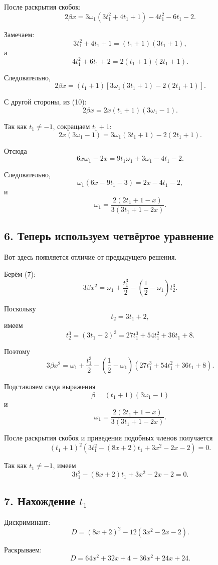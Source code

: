 \documentclass[12pt,a4paper]{article}
\begin{document}
	После раскрытия скобок:
	\[
	2\beta x
	=
	3\omega_1(3t_1^2+4t_1+1)
	-4t_1^2-6t_1-2.
	\]
	
	Замечаем:
	\[
	3t_1^2+4t_1+1=(t_1+1)(3t_1+1),
	\]
	а
	\[
	4t_1^2+6t_1+2
	=
	2(t_1+1)(2t_1+1).
	\]
	
	Следовательно,
	\[
	2\beta x
	=
	(t_1+1)
	\left[
	3\omega_1(3t_1+1)-2(2t_1+1)
	\right].
	\tag{11}
	\]
	
	С другой стороны, из (10):
	\[
	2\beta x
	=
	2x(t_1+1)(3\omega_1-1).
	\tag{12}
	\]
	
	Так как $t_1\neq -1$, сокращаем $t_1+1$:
	\[
	2x(3\omega_1-1)
	=
	3\omega_1(3t_1+1)-2(2t_1+1).
	\]
	
	Отсюда
	\[
	6x\omega_1-2x
	=
	9t_1\omega_1+3\omega_1-4t_1-2.
	\]
	
	Следовательно,
	\[
	\omega_1(6x-9t_1-3)
	=
	2x-4t_1-2,
	\]
	и
	\[
	\boxed{
		\omega_1=
		\frac{2(2t_1+1-x)}
		{3(3t_1+1-2x)}
	}.
	\tag{13}
	\]
	
	\subsection*{6. Теперь используем четвёртое уравнение}
	
	Вот здесь появляется отличие от предыдущего решения.
	
	Берём (7):
	\[
	3\beta x^2
	=
	\omega_1+\frac{t_1^3}{2}
	-\left(\frac12-\omega_1\right)t_2^3.
	\]
	
	Поскольку
	\[
	t_2=3t_1+2,
	\]
	имеем
	\[
	t_2^3
	=
	(3t_1+2)^3
	=
	27t_1^3+54t_1^2+36t_1+8.
	\]
	
	Поэтому
	\[
	3\beta x^2
	=
	\omega_1+\frac{t_1^3}{2}
	-\left(\frac12-\omega_1\right)
	(27t_1^3+54t_1^2+36t_1+8).
	\]
	
	Подставляем сюда выражения
	\[
	\beta=(t_1+1)(3\omega_1-1)
	\]
	и
	\[
	\omega_1=
	\frac{2(2t_1+1-x)}
	{3(3t_1+1-2x)}.
	\]
	
	После раскрытия скобок и приведения подобных членов получается
	\[
	\boxed{
		(t_1+1)^2
		\left(
		3t_1^2-(8x+2)t_1+3x^2-2x-2
		\right)=0.
	}
	\tag{14}
	\]
	
	Так как $t_1\neq -1$, имеем
	\[
	3t_1^2-(8x+2)t_1+3x^2-2x-2=0.
	\tag{15}
	\]
	
	\subsection*{7. Нахождение $t_1$}
	
	Дискриминант:
	\[
	D=(8x+2)^2-12(3x^2-2x-2).
	\]
	
	Раскрываем:
	\[
	D
	=
	64x^2+32x+4
	-36x^2+24x+24.
	\]
	
\end{document}
